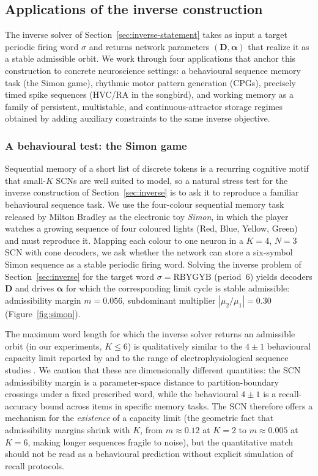 \documentclass[12pt]{article}
\newcommand{\vv}[1]{\mathbf{#1}}
\begin{document}
\subsection{Applications of the inverse construction}\label{sec:inverse-applications}

The inverse solver of Section~\ref{sec:inverse-statement} takes as input a target periodic firing word $\sigma$ and returns network parameters $(\vv{D},\boldsymbol{\alpha})$ that realize it as a stable admissible orbit. We work through four applications that anchor this construction to concrete neuroscience settings: a behavioural sequence memory task (the Simon game), rhythmic motor pattern generation (CPGs), precisely timed spike sequences (HVC/RA in the songbird), and working memory as a family of persistent, multistable, and continuous-attractor storage regimes obtained by adding auxiliary constraints to the same inverse objective.

\subsubsection{A behavioural test: the Simon game}\label{sec:apps-simon}

Sequential memory of a short list of discrete tokens is a recurring cognitive motif that small-$K$ SCNs are well suited to model, so a natural stress test for the inverse construction of Section~\ref{sec:inverse} is to ask it to reproduce a familiar behavioural sequence task. We use the four-colour sequential memory task released by Milton Bradley as the electronic toy \emph{Simon}, in which the player watches a growing sequence of four coloured lights (Red, Blue, Yellow, Green) and must reproduce it. Mapping each colour to one neuron in a $K=4$, $N=3$ SCN with cone decoders, we ask whether the network can store a six-symbol Simon sequence as a stable periodic firing word. Solving the inverse problem of Section~\ref{sec:inverse} for the target word $\sigma=\text{RBYGYB}$ (period~$6$) yields decoders $\vv{D}$ and drives $\boldsymbol{\alpha}$ for which the corresponding limit cycle is stable admissible: admissibility margin $m=0.056$, subdominant multiplier $|\mu_2/\mu_1|=0.30$ (Figure~\ref{fig:simon}).

The maximum word length for which the inverse solver returns an admissible orbit (in our experiments, $K\leq 6$) is qualitatively similar to the $4\pm 1$ behavioural capacity limit reported by \citet{cowan2001magical} and to the range of electrophysiological sequence studies \citep{averbeck2002parallel,baeg2003dynamics}. We caution that these are dimensionally different quantities: the SCN admissibility margin is a parameter-space distance to partition-boundary crossings under a fixed prescribed word, while the behavioural $4\pm 1$ is a recall-accuracy bound across items in specific memory tasks. The SCN therefore offers a mechanism for the \emph{existence} of a capacity limit (the geometric fact that admissibility margins shrink with $K$, from $m\approx 0.12$ at $K=2$ to $m\approx 0.005$ at $K=6$, making longer sequences fragile to noise), but the quantitative match should not be read as a behavioural prediction without explicit simulation of recall protocols.
\end{document}

